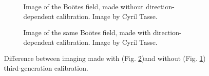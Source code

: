 \begin{figure}[h!]
\centering
\begin{subfigure}{\textwidth}
\caption{\label{fig.lofar.noDDcal} Image of the Boötes field, made without direction-dependent calibration. Image by Cyril Tasse.}
\end{subfigure}
\begin{subfigure}{\textwidth}
\caption{\label{fig.lofar.withDDcal} Image of the same Boötes field, made with direction-dependent calibration. Image by Cyril Tasse.}
\end{subfigure}
\caption{\label{fig.DDcal.effect} Difference between imaging made with (Fig. \ref{fig.lofar.withDDcal})and without (Fig. \ref{fig.lofar.noDDcal}) third-generation calibration.}
\end{figure}







